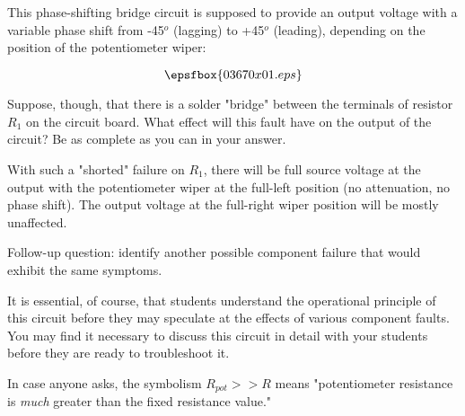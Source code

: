 

This phase-shifting bridge circuit is supposed to provide an output voltage with a variable phase shift from -45$^{o}$ (lagging) to +45$^{o}$ (leading), depending on the position of the potentiometer wiper:

$$\epsfbox{03670x01.eps}$$

Suppose, though, that there is a solder "bridge" between the terminals of resistor $R_1$ on the circuit board.  What effect will this fault have on the output of the circuit?  Be as complete as you can in your answer.







With such a "shorted" failure on $R_1$, there will be full source voltage at the output with the potentiometer wiper at the full-left position (no attenuation, no phase shift).  The output voltage at the full-right wiper position will be mostly unaffected.

\vskip 10pt

Follow-up question: identify another possible component failure that would exhibit the same symptoms.







It is essential, of course, that students understand the operational principle of this circuit before they may speculate at the effects of various component faults.  You may find it necessary to discuss this circuit in detail with your students before they are ready to troubleshoot it.

In case anyone asks, the symbolism $R_{pot} >> R$ means "potentiometer resistance is {\it much} greater than the fixed resistance value."




